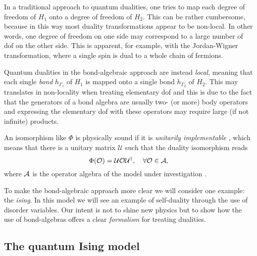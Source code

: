 In a traditional approach to quantum dualities, one tries to map each degree of freedom of $H_1$ onto a degree of freedom of $H_2$.
This can be rather cumbersome, because in this way most duality transformations appear to be non-local.
In other words, one degree of freedom on one side may correspond to a large number of \ac{dof} on the other side.
This is apparent, for example, with the Jordan-Wigner transformation, where a single spin is dual to a whole chain of fermions.

Quantum dualities in the bond-algebraic approach are instead \emph{local}, meaning that each single \emph{bond} $h_{\Gamma_1}$ of $H_1$ is mapped onto a single bond $h_{\Gamma_2}$ of $H_2$.
This may translates in non-locality when treating elementary \ac{dof} and this is due to the fact that the generators of a bond algebra are usually two- (or more) body operators and expressing the elementary \ac{dof} with these operators may require large (if not infinite) products.

An isomorphism like $\Phi$ is physically sound if it is \emph{unitarily implementable} \cite{cobanera2011bond}, which means that there is a unitary matrix $\mathcal{U}$ such that the duality isomorphism reads
\begin{equation}
    \Phi(\mathcal{O}) =
    \mathcal{U} \mathcal{O} \mathcal{U}^{\dagger}, \quad
    \forall \mathcal{O} \in \mathcal{A},
\end{equation}
where $\mathcal{A}$ is the operator algebra of the model under investigation \cite{cobanera2011bond}.


To make the bond-algebraic approach more clear we will consider one example: the \emph{\acf{ising}}.
In this model we will see an example of self-duality through the use of disorder variables.
Our intent is not to shine new physics but to show how the use of bond-algebras offers a clear \emph{formalism} for treating dualities.

\subsection{The quantum Ising model}
\label{sub:the_quantum_ising_model}

